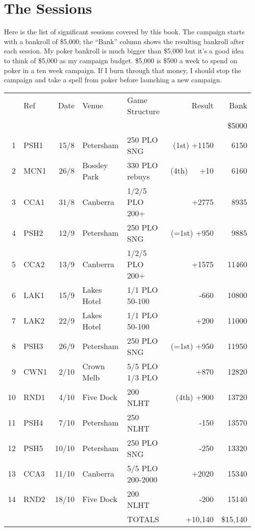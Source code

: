 \chapter{The Sessions}

Here is the list of significant sessions covered by this book. The
campaign starts with a bankroll of \$5,000; the ``Bank'' column shows
the resulting bankroll after each session. My poker bankroll is much
bigger than \$5,000 but it's a good idea to think of \$5,000 as my
campaign budget. \$5,000 is \$500 a week to spend on poker in a ten
week campaign. If I burn through that money, I should stop the
campaign and take a spell from poker before launching a new campaign.

\begin{tabular}{rlrllrr}
     & Ref & Date & Venue & Game Structure & Result & Bank \\
     &           &      &           &             &       & \$5000 \\
  1  &   PSH1    & 15/8 & Petersham & 250 PLO SNG & (1st) +1150 & 6150 \\
  2  &   MCN1    & 26/8 & Bossley Park & 330 PLO rebuys & (4th)~~~+10 & 6160 \\
  3  &   CCA1    & 31/8 & Canberra  & 1/2/5 PLO 200+ & +2775 & 8935 \\
  4  &   PSH2    & 12/9 & Petersham & 250 PLO SNG & (=1st) +950 & 9885 \\
  5  &   CCA2    & 13/9 & Canberra  & 1/2/5 PLO 200+ & +1575 & 11460 \\
  6  &   LAK1    & 15/9 & Lakes Hotel & 1/1 PLO 50-100 & -660 & 10800 \\
  7  &   LAK2    & 22/9 & Lakes Hotel & 1/1 PLO 50-100 & +200 & 11000 \\
  8  &   PSH3    & 26/9 & Petersham & 250 PLO SNG & (=1st) +950 & 11950 \\
  9  &   CWN1    & 2/10 & Crown Melb & 5/5 PLO 1/3 PLO & +870 & 12820 \\
 10  &   RND1    & 4/10 & Five Dock & 200 NLHT & (4th) +900 & 13720 \\
 11  &   PSH4    & 7/10 & Petersham & 250 NLHT & -150 & 13570 \\
 12  &   PSH5    & 10/10 & Petersham & 250 PLO SNG & -250 & 13320 \\
 13  &   CCA3    & 11/10 & Canberra  & 5/5 PLO 200-2000 & +2020 & 15340 \\
 14  &   RND2    & 18/10 & Five Dock & 200 NLHT & -200 & 15140 \\
     &           &       &           & TOTALS & +10,140 & \$15,140 \\
\end{tabular}

